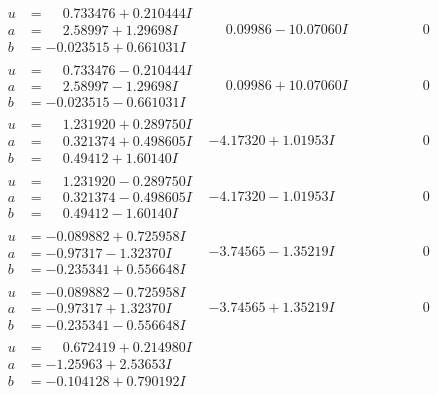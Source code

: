 \documentclass[1p]{elsarticle_modified}
\theoremstyle{definition}
\begin{document}
$$\begin{array}{c|c|c}
 \hline 
\begin{aligned}
u &= \phantom{-}0.733476 + 0.210444 I \\
a &= \phantom{-}2.58997 + 1.29698 I \\
b &= -0.023515 + 0.661031 I\end{aligned}
 & \phantom{-}0.09986 - 10.07060 I & \phantom{-0.000000 } 0 \\ \hline\begin{aligned}
u &= \phantom{-}0.733476 - 0.210444 I \\
a &= \phantom{-}2.58997 - 1.29698 I \\
b &= -0.023515 - 0.661031 I\end{aligned}
 & \phantom{-}0.09986 + 10.07060 I & \phantom{-0.000000 } 0 \\ \hline\begin{aligned}
u &= \phantom{-}1.231920 + 0.289750 I \\
a &= \phantom{-}0.321374 + 0.498605 I \\
b &= \phantom{-}0.49412 + 1.60140 I\end{aligned}
 & -4.17320 + 1.01953 I & \phantom{-0.000000 } 0 \\ \hline\begin{aligned}
u &= \phantom{-}1.231920 - 0.289750 I \\
a &= \phantom{-}0.321374 - 0.498605 I \\
b &= \phantom{-}0.49412 - 1.60140 I\end{aligned}
 & -4.17320 - 1.01953 I & \phantom{-0.000000 } 0 \\ \hline\begin{aligned}
u &= -0.089882 + 0.725958 I \\
a &= -0.97317 - 1.32370 I \\
b &= -0.235341 + 0.556648 I\end{aligned}
 & -3.74565 - 1.35219 I & \phantom{-0.000000 } 0 \\ \hline\begin{aligned}
u &= -0.089882 - 0.725958 I \\
a &= -0.97317 + 1.32370 I \\
b &= -0.235341 - 0.556648 I\end{aligned}
 & -3.74565 + 1.35219 I & \phantom{-0.000000 } 0 \\ \hline\begin{aligned}
u &= \phantom{-}0.672419 + 0.214980 I \\
a &= -1.25963 + 2.53653 I \\
b &= -0.104128 + 0.790192 I\end{aligned}

\end{array}$$
\end{document}
